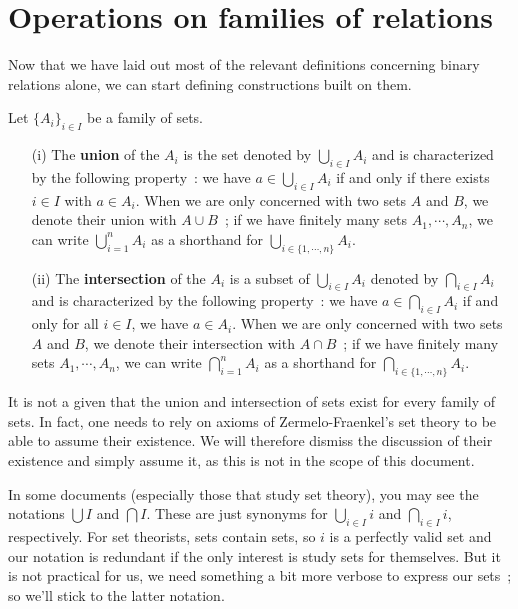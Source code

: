 \section{Operations on families of relations}

Now that we have laid out most of the relevant definitions concerning binary relations alone, we can start defining constructions built on them. 
\\

\begin{definition}
	Let $\{A_i\}_{i \in I}$ be a family of sets.
	\\
	
	\begin{itemize}
		\item[(i)] The \textbf{union} of the $A_i$ is the set denoted by $\bigcup_{i \in I} A_i$ and is characterized by the following property~: we have $a \in \bigcup_{i \in I} A_i$ if and only if there exists $i \in I$ with $a \in A_i$. When we are only concerned with two sets $A$ and $B$, we denote their union with $A \cup B$~; if we have finitely many sets $A_1,\cdots,A_n$, we can write $\bigcup_{i=1}^n A_i$ as a shorthand for $\bigcup_{i \in \{1,\cdots,n\}} A_i$. 
		\\

		\item[(ii)] The \textbf{intersection} of the $A_i$ is a subset of $\bigcup_{i \in I} A_i$ denoted by $\bigcap_{i \in I} A_i$ and is characterized by the following property~: we have $a \in \bigcap_{i \in I} A_i$ if and only for all $i \in I$, we have $a \in A_i$. When we are only concerned with two sets $A$ and $B$, we denote their intersection with $A \cap B$~; if we have finitely many sets $A_1,\cdots,A_n$, we can write $\bigcap_{i=1}^n A_i$ as a shorthand for $\bigcap_{i \in \{1,\cdots,n\}} A_i$. 
		\\
	\end{itemize}
\end{definition}

\begin{remark}
	It is not a given that the union and intersection of sets exist for every family of sets. In fact, one needs to rely on axioms of Zermelo-Fraenkel's set theory to be able to assume their existence. We will therefore dismiss the discussion of their existence and simply assume it, as this is not in the scope of this document.
\end{remark}

\begin{remark}
	In some documents (especially those that study set theory), you may see the notations $\bigcup I$ and $\bigcap I$. These are just synonyms for $\bigcup_{i \in I} i$ and $\bigcap_{i \in I} i$, respectively. For set theorists, sets contain sets, so $i$ is a perfectly valid set and our notation is redundant if the only interest is study sets for themselves. But it is not practical for us, we need something a bit more verbose to express our sets~; so we'll stick to the latter notation.
\end{remark}

